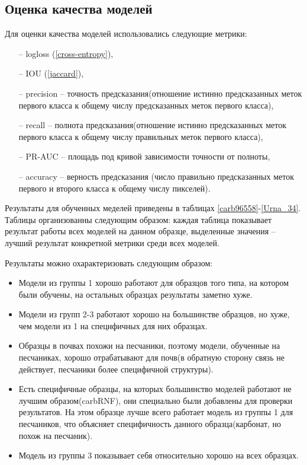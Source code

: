 \documentclass[12pt, a4paper]{extarticle}
\begin{document}
\subsection{Оценка качества моделей}

Для оценки качества моделей использовались следующие метрики:
\begin{itemize}
	\item[--] logloss (\ref{cross-entropy}),
	
	\item[--] IOU (\ref{jaccard}),
	
	\item[--] precision -- точность предсказания(отношение истинно предсказанных меток первого класса к общему числу предсказанных меток первого класса),
	
	\item[--] recall -- полнота предсказания(отношение истинно предсказанных меток первого класса к общему числу правильных меток первого класса),
	
	\item[--] PR-AUC -- площадь под кривой зависимости точности от полноты, 
	
	\item[--] accuracy -- верность предсказания (число правильно предсказанных меток первого и второго класса к общему числу пикселей).
\end{itemize}

Результаты для обученных меделей приведены в таблицах \ref{carb96558}-\ref{Urna_34}. Таблицы организованны следующим образом: каждая таблица показывает результат работы всех моделей на данном образце, выделенные значения -- лучший результат конкретной метрики среди всех моделей. 

Результаты можно охарактеризовать следующим образом:
\begin{itemize}
	\item Модели из группы 1 хорошо работают для образцов того типа, на котором были обучены, на остальных образцах результаты заметно хуже.
	
	\item Модели из групп 2-3 работают хорошо на большинстве образцов, но хуже, чем модели из 1 на специфичных для них образцах.
	
	\item Образцы в почвах похожи на песчаники, поэтому модели, обученные на песчаниках, хорошо отрабатывают для почв(в обратную сторону связь не действует, песчаники более специфичной структуры).
	
	\item Есть специфичные образцы, на которых большинство моделей работают не лучшим образом(carbRNF), они специально были добавлены для проверки результатов. На этом образце лучше всего работает модель из группы 1 для песчаников, что объясняет специфичность данного образца(карбонат, но похож на песчаник).
	
	\item Модель из группы 3 показывает себя относительно хорошо на всех образцах.
	
\end{itemize}
\end{document}
